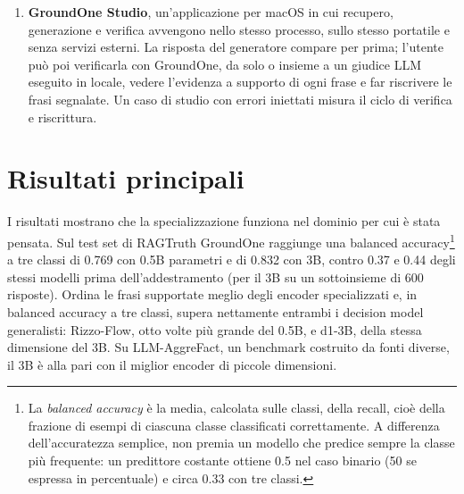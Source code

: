 \begin{enumerate}
etichette coerenti, quanto aiutino a rinviare le decisioni incerte e come tempo ed energia di una verifica crescano con la
lunghezza della risposta. Lo studio si inserisce in un'analisi dell'inferenza locale che combina le specifiche dei
produttori con misure proprie per stabilire, per ogni classe di hardware consumer, il costo minimo che un verificatore
che genera testo deve pagare e che un decision model non paga.
\item \textbf{GroundOne Studio}, un'applicazione per macOS in cui recupero, generazione e verifica avvengono nello stesso
processo, sullo stesso portatile e senza servizi esterni. La risposta del generatore compare per prima; l'utente può poi
verificarla con GroundOne, da solo o insieme a un giudice LLM eseguito in locale, vedere l'evidenza a supporto di
ogni frase e far riscrivere le frasi segnalate. Un caso di studio con errori iniettati misura il ciclo di verifica e
riscrittura.
\end{enumerate}

\section{Risultati principali}
\label{sec:intro-results}

I risultati mostrano che la specializzazione funziona nel dominio per cui è stata pensata. Sul test set di RAGTruth
GroundOne raggiunge una balanced accuracy\footnote{La \emph{balanced accuracy} è la media, calcolata sulle classi, della recall, cioè della frazione di esempi di ciascuna classe classificati correttamente. A differenza dell'accuratezza semplice, non premia un modello che predice sempre la classe più frequente: un predittore costante ottiene 0.5 nel caso binario (50 se espressa in percentuale) e circa 0.33 con tre classi.} a tre classi di 0.769 con 0.5B parametri e di 0.832 con 3B, contro 0.37 e 0.44 degli stessi modelli prima dell'addestramento (per il 3B su un sottoinsieme di 600 risposte). Ordina le frasi supportate meglio degli encoder specializzati e, in balanced accuracy a tre classi, supera nettamente entrambi i decision model generalisti: Rizzo-Flow, otto volte più grande del 0.5B, e d1-3B, della stessa
dimensione del 3B. Su LLM-AggreFact, un benchmark costruito da fonti diverse, il 3B è alla pari con il miglior encoder di
piccole dimensioni.

